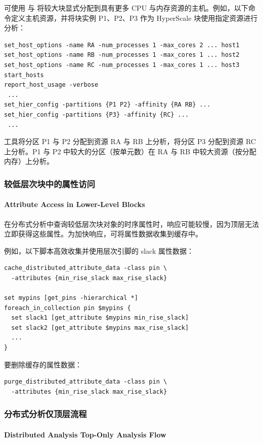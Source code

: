 可使用  与  将较大块显式分配到具有更多 CPU 与内存资源的主机。例如，以下命令定义主机资源，并将块实例 P1、P2、P3 作为 HyperScale 块使用指定资源进行分析：
\begin{lstlisting}
set_host_options -name RA -num_processes 1 -max_cores 2 ... host1
set_host_options -name RB -num_processes 1 -max_cores 1 ... host2
set_host_options -name RC -num_processes 1 -max_cores 1 ... host3
start_hosts
report_host_usage -verbose
 ...
set_hier_config -partitions {P1 P2} -affinity {RA RB} ...
set_hier_config -partitions {P3} -affinity {RC} ...
 ...
\end{lstlisting}

工具将分区 P1 与 P2 分配到资源 RA 与 RB 上分析，将分区 P3 分配到资源 RC 上分析。P1 与 P2 中较大的分区（按单元数）在 RA 与 RB 中较大资源（按分配内存）上分析。

\subsubsection{较低层次块中的属性访问}
\paragraph*{Attribute Access in Lower-Level Blocks}

在分布式分析中查询较低层次块对象的时序属性时，响应可能较慢，因为顶层无法立即获得这些属性。为加快响应，可将属性数据收集到缓存中。

例如，以下脚本高效收集并使用层次引脚的 slack 属性数据：
\begin{lstlisting}
cache_distributed_attribute_data -class pin \
  -attributes {min_rise_slack max_rise_slack}

set mypins [get_pins -hierarchical *]
foreach_in_collection pin $mypins {
  set slack1 [get_attribute $mypins min_rise_slack]
  set slack2 [get_attribute $mypins max_rise_slack]
  ...
}
\end{lstlisting}

要删除缓存的属性数据：
\begin{lstlisting}
purge_distributed_attribute_data -class pin \
  -attributes {min_rise_slack max_rise_slack}
\end{lstlisting}

\subsubsection{分布式分析仅顶层流程}
\paragraph*{Distributed Analysis Top-Only Analysis Flow}

